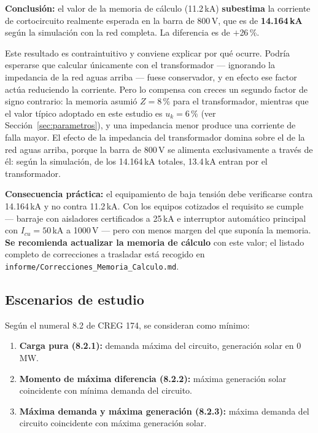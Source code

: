 \documentclass[11pt,a4paper]{article}
\begin{document}
\textbf{Conclusi\'on:} el valor de la memoria de c\'alculo (11.2\,kA) \textbf{subestima} la corriente de cortocircuito realmente esperada en la barra de 800\,V, que es de \textbf{14.164\,kA} seg\'un la simulaci\'on con la red completa. La diferencia es de $+$26\,\%.

Este resultado es contraintuitivo y conviene explicar por qu\'e ocurre. Podr\'ia esperarse que calcular \'unicamente con el transformador --- ignorando la impedancia de la red aguas arriba --- fuese conservador, y en efecto ese factor act\'ua reduciendo la corriente. Pero lo compensa con creces un segundo factor de signo contrario: la memoria asumi\'o $Z=8\,\%$ para el transformador, mientras que el valor t\'ipico adoptado en este estudio es $u_k=6\,\%$ (ver Secci\'on~\ref{sec:parametros}), y una impedancia menor produce una corriente de falla mayor. El efecto de la impedancia del transformador domina sobre el de la red aguas arriba, porque la barra de 800\,V se alimenta exclusivamente a trav\'es de \'el: seg\'un la simulaci\'on, de los 14.164\,kA totales, 13.4\,kA entran por el transformador.

\textbf{Consecuencia pr\'actica:} el equipamiento de baja tensi\'on debe verificarse contra 14.164\,kA y no contra 11.2\,kA. Con los equipos cotizados el requisito se cumple --- barraje con aisladores certificados a 25\,kA e interruptor autom\'atico principal con $I_{cu}=50$\,kA a 1000\,V --- pero con menos margen del que supon\'ia la memoria. \textbf{Se recomienda actualizar la memoria de c\'alculo} con este valor; el listado completo de correcciones a trasladar est\'a recogido en \texttt{informe/Correcciones\_Memoria\_Calculo.md}.

\subsection{Escenarios de estudio}
\label{sec:escenarios}
Seg\'un el numeral 8.2 de CREG 174, se consideran como m\'inimo:
\begin{enumerate}[label=\alph*)]
    \item \textbf{Carga pura (8.2.1):} demanda m\'axima del circuito, generaci\'on solar en 0\,MW.
    \item \textbf{Momento de m\'axima diferencia (8.2.2):} m\'axima generaci\'on solar coincidente con m\'inima demanda del circuito.
    \item \textbf{M\'axima demanda y m\'axima generaci\'on (8.2.3):} m\'axima demanda del circuito coincidente con m\'axima generaci\'on solar.
\end{enumerate}
\end{document}
